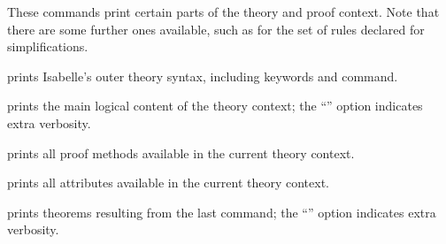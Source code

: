 \begin{isabellebody}
\begin{isamarkuptext}
  These commands print certain parts of the theory and proof context.
  Note that there are some further ones available, such as for the set
  of rules declared for simplifications.

  \begin{description}
  
  \item \hyperlink{command.print-commands}{\mbox{}} prints Isabelle's outer theory
  syntax, including keywords and command.
  
  \item \hyperlink{command.print-theory}{\mbox{}} prints the main logical content of
  the theory context; the ``'' option indicates extra
  verbosity.

  \item \hyperlink{command.print-methods}{\mbox{}} prints all proof methods
  available in the current theory context.
  
  \item \hyperlink{command.print-attributes}{\mbox{}} prints all attributes
  available in the current theory context.
  
  \item \hyperlink{command.print-theorems}{\mbox{}} prints theorems resulting from the
  last command; the ``'' option indicates extra verbosity.
  

\end{description}
\end{isamarkuptext}
\end{isabellebody}
